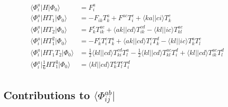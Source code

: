 \documentclass[letterpaper,12pt]{article}
\newcommand{\ket}[1]{\lvert #1 \rangle}
\newcommand{\bra}[1]{\langle #1 \vert}
\begin{document}
\begin{align*}
\bra{\Phi^a_i}H\ket{\Phi_0} &= F^a_i \\
\bra{\Phi^a_i}HT_1\ket{\Phi_0} &= -F_{ik}T^a_k + F^{ac}T^c_i + \bra{ka}\ket{ci}T^c_k \\
\bra{\Phi^a_i}HT_2\ket{\Phi_0} &= F^c_kT^{ac}_{ik} + \bra{ak}\ket{cd}T^{cd}_{ik} 
                                   - \bra{kl}\ket{ic}T^{ac}_{kl} \\
\bra{\Phi^a_i}HT_1^2\ket{\Phi_0} &= -F^c_kT^c_iT^a_k + \bra{ak}\ket{cd}T^c_iT^d_k 
                                    - \bra{kl}\ket{ic}T^a_kT^c_l \\
\bra{\Phi^a_i}HT_1T_2\ket{\Phi_0} &=\frac{1}{2}\bra{kl}\ket{cd}T^{cd}_{ki}T^a_l 
                                      - \frac{1}{2} \bra{kl}\ket{cd}T^{ac}_{kl}T^d_i 
                                      + \bra{kl}\ket{cd}T^{ac}_{ik}T^d_l \\
\bra{\Phi^a_i}\frac{1}{6}HT_1^3\ket{\Phi_0} &=\bra{kl}\ket{cd}T^a_kT^c_lT^d_i \\
\end{align*}

\newpage

\subsection{Contributions to $\bra{\Phi^{ab}_{ij}}$}
\end{document}
